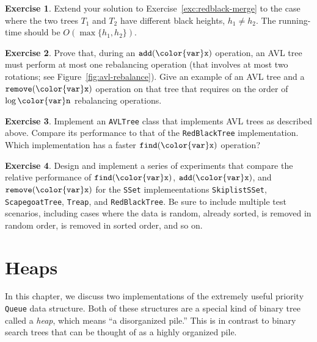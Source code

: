 \documentclass[10pt]{book}
\newcommand{\chaplabel}[1]{\label{chap:#1}}
\newcommand{\figref}[1]{Figure~\ref{fig:#1}}
\theoremstyle{plain}
\theoremstyle{definition}
\newtheorem{exc}{Exercise}[chapter]
\newcommand{\excref}[1]{Exercise~\ref{exc:#1}}
\begin{document}
\begin{exc}
  Extend your solution to \excref{redblack-merge} to the case where the
  two trees $T_1$ and $T_2$ have different black heights, $h_1\neq h_2$.
  The running-time should be $O(\max\{h_1,h_2\})$.
\end{exc}



\begin{exc}
  Prove that, during an \ensuremath{\mathtt{add({\color{var}x})}} operation, an AVL tree must perform
  at most one rebalancing operation (that involves at most two rotations;
  see \figref{avl-rebalance}).  Give an example of an AVL tree and a
  \ensuremath{\mathtt{remove({\color{var}x})}} operation on that tree that requires on the order of $\log
  \ensuremath{\mathtt{{\color{var}n}}}$ rebalancing operations.
\end{exc}

\begin{exc}
  Implement an \texttt{AVLTree} class that implements AVL trees as described
  above.  Compare its performance to that of the \texttt{RedBlackTree}
  implementation.   Which implementation has a faster \ensuremath{\mathtt{find({\color{var}x})}} operation?
\end{exc}

\begin{exc}
  Design and implement a series of experiments that compare the relative
  performance of \ensuremath{\mathtt{find({\color{var}x})}}, \ensuremath{\mathtt{add({\color{var}x})}}, and \ensuremath{\mathtt{remove({\color{var}x})}} for the \texttt{SSet} implemeentations \texttt{SkiplistSSet},
  \texttt{ScapegoatTree}, \texttt{Treap}, and \texttt{RedBlackTree}.  Be sure to include
  multiple test scenarios, including cases where the data is random,
  already sorted, is removed in random order, is removed in sorted order,
  and so on.
\end{exc}

\clearpage

\clearpage
\chapter{Heaps}
\chaplabel{heaps}

In this chapter, we discuss two implementations of the extremely useful
priority \texttt{Queue} data structure.  Both of these structures are a special
kind of binary tree called a \emph{heap}, 
%
%
%
which means ``a disorganized
pile.''  This is in contrast to binary search trees that can be thought
of as a highly organized pile.
\end{document}
